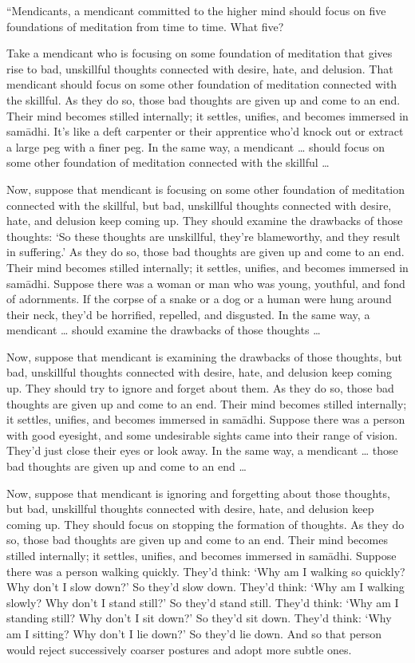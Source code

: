 \documentclass[12pt,openany]{book}%
\begin{document}
“Mendicants, a mendicant committed to the higher mind should focus on five foundations of meditation from time to time. What five? 

Take a mendicant who is focusing on some foundation of meditation that gives rise to bad, unskillful thoughts connected with desire, hate, and delusion. That mendicant should focus on some other foundation of meditation connected with the skillful. As they do so, those bad thoughts are given up and come to an end. Their mind becomes stilled internally; it settles, unifies, and becomes immersed in \textsanskrit{samādhi}. It’s like a deft carpenter or their apprentice who’d knock out or extract a large peg with a finer peg. In the same way, a mendicant … should focus on some other foundation of meditation connected with the skillful … 

Now, suppose that mendicant is focusing on some other foundation of meditation connected with the skillful, but bad, unskillful thoughts connected with desire, hate, and delusion keep coming up. They should examine the drawbacks of those thoughts: ‘So these thoughts are unskillful, they’re blameworthy, and they result in suffering.’ As they do so, those bad thoughts are given up and come to an end. Their mind becomes stilled internally; it settles, unifies, and becomes immersed in \textsanskrit{samādhi}. Suppose there was a woman or man who was young, youthful, and fond of adornments. If the corpse of a snake or a dog or a human were hung around their neck, they’d be horrified, repelled, and disgusted. In the same way, a mendicant … should examine the drawbacks of those thoughts … 

Now, suppose that mendicant is examining the drawbacks of those thoughts, but bad, unskillful thoughts connected with desire, hate, and delusion keep coming up. They should try to ignore and forget about them. As they do so, those bad thoughts are given up and come to an end. Their mind becomes stilled internally; it settles, unifies, and becomes immersed in \textsanskrit{samādhi}. Suppose there was a person with good eyesight, and some undesirable sights came into their range of vision. They’d just close their eyes or look away. In the same way, a mendicant … those bad thoughts are given up and come to an end … 

Now, suppose that mendicant is ignoring and forgetting about those thoughts, but bad, unskillful thoughts connected with desire, hate, and delusion keep coming up. They should focus on stopping the formation of thoughts. As they do so, those bad thoughts are given up and come to an end. Their mind becomes stilled internally; it settles, unifies, and becomes immersed in \textsanskrit{samādhi}. Suppose there was a person walking quickly. They’d think: ‘Why am I walking so quickly? Why don’t I slow down?’ So they’d slow down. They’d think: ‘Why am I walking slowly? Why don’t I stand still?’ So they’d stand still. They’d think: ‘Why am I standing still? Why don’t I sit down?’ So they’d sit down. They’d think: ‘Why am I sitting? Why don’t I lie down?’ So they’d lie down. And so that person would reject successively coarser postures and adopt more subtle ones. 
\end{document}
